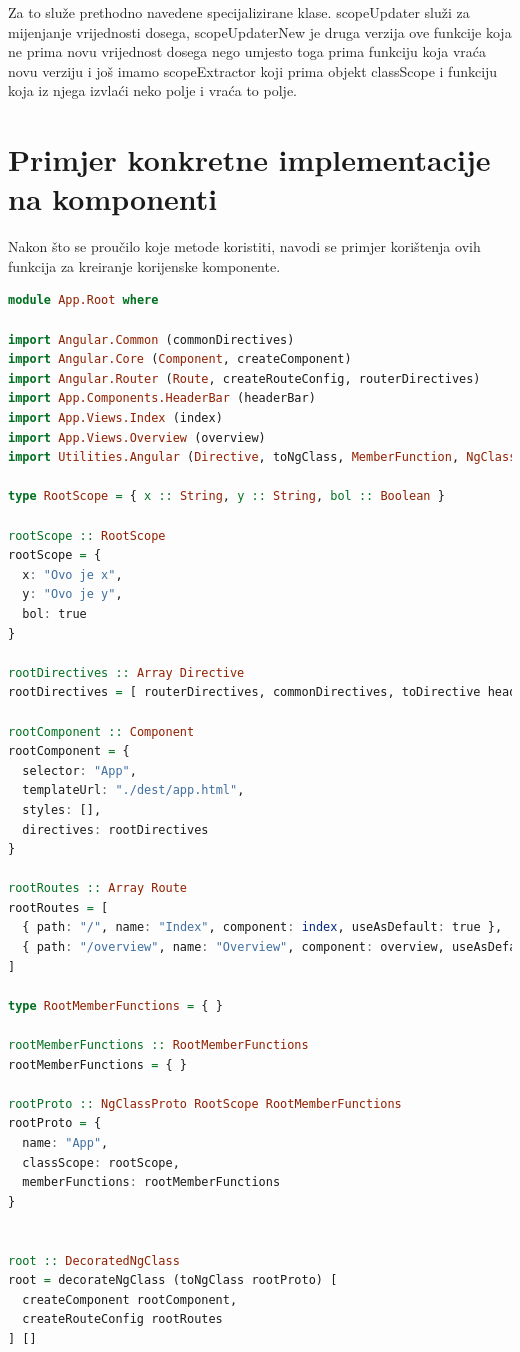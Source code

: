 \documentclass[times, utf8, zavrsni]{fer}
\begin{document}
Za to služe prethodno navedene specijalizirane klase. scopeUpdater služi za mijenjanje vrijednosti dosega, scopeUpdaterNew je druga verzija ove funkcije koja ne prima novu vrijednost dosega nego umjesto toga prima funkciju koja vraća novu verziju i još imamo scopeExtractor koji prima objekt classScope i funkciju koja iz njega izvlaći neko polje i vraća to polje.

\section{Primjer konkretne implementacije na komponenti}
Nakon što se proučilo koje metode koristiti, navodi se primjer korištenja ovih funkcija za kreiranje korijenske komponente.

\begin{lstlisting}[language=PureScript, basicstyle=\small\linespread{0.8}]
module App.Root where

import Angular.Common (commonDirectives)
import Angular.Core (Component, createComponent)
import Angular.Router (Route, createRouteConfig, routerDirectives)
import App.Components.HeaderBar (headerBar)
import App.Views.Index (index)
import App.Views.Overview (overview)
import Utilities.Angular (Directive, toNgClass, MemberFunction, NgClassProto, toDirective, NgClass, DecoratedNgClass, decorateNgClass)

type RootScope = { x :: String, y :: String, bol :: Boolean }

rootScope :: RootScope
rootScope = {
  x: "Ovo je x",
  y: "Ovo je y",
  bol: true
}

rootDirectives :: Array Directive
rootDirectives = [ routerDirectives, commonDirectives, toDirective headerBar ]

rootComponent :: Component
rootComponent = {
  selector: "App",
  templateUrl: "./dest/app.html",
  styles: [],
  directives: rootDirectives
}

rootRoutes :: Array Route
rootRoutes = [
  { path: "/", name: "Index", component: index, useAsDefault: true },
  { path: "/overview", name: "Overview", component: overview, useAsDefault: false }
]

type RootMemberFunctions = { }

rootMemberFunctions :: RootMemberFunctions
rootMemberFunctions = { }

rootProto :: NgClassProto RootScope RootMemberFunctions
rootProto = {
  name: "App",
  classScope: rootScope,
  memberFunctions: rootMemberFunctions
}


root :: DecoratedNgClass
root = decorateNgClass (toNgClass rootProto) [
  createComponent rootComponent,
  createRouteConfig rootRoutes
] []

\end{lstlisting}
\end{document}
